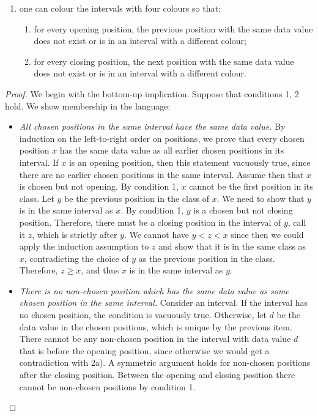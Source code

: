 {\begin{lemma}
\begin{enumerate}
\begin{align*}
\end{align*}	
\item one can colour the intervals with four colours so that:
\begin{enumerate}
\item for every opening position, the previous position with the same data value does not exist or is in an interval with a different colour;
\item for every closing position, the next position with the same data value does not exist or is in an interval with a different colour.
\end{enumerate}
\end{enumerate}
\end{lemma}
\begin{proof}
We begin with the bottom-up implication. Suppose that conditions 1, 2 hold. We show membership in the language:
\begin{itemize}
	\item \emph{All chosen positions in the same interval have the same data value.} By induction on the left-to-right order on positions, we prove that every chosen position $x$ has the same data value as all earlier chosen positions in its interval. If $x$ is an opening position, then this statement vacuously true, since there are no earlier chosen positions in the same interval. Assume then that $x$ is chosen but not opening. By condition 1, $x$ cannot be the first position in its class. Let $y$ be the previous position in the class of $x$. We need to show that $y$ is in the same interval as $x$. By condition 1, $y$ is a chosen but not closing position. Therefore, there must be a closing position in the interval of $y$, call it $z$, which is strictly after $y$. We cannot have $y < z < x$ since then we could apply the induction assumption to $z$ and show that it is in the same class as $x$, contradicting the choice of $y$ as the previous position in the class. Therefore, $z \ge x$, and thus $x$ is in the same interval as $y$. 
	\item \emph{There is no non-chosen position which has the same data value as some chosen position in the same interval.} Consider an interval. If the interval has no chosen position, the condition is vacuously true. Otherwise, let $d$ be the data value in the chosen positions, which is unique by the previous item. There cannot be any non-chosen position in the interval with data value $d$ that is before the opening position, since otherwise we would get a contradiction with 2a). A symmetric argument holds for non-chosen positions after the closing position. Between the opening and closing position there cannot be non-chosen positions by condition 1.

\end{itemize}
\end{proof}}
